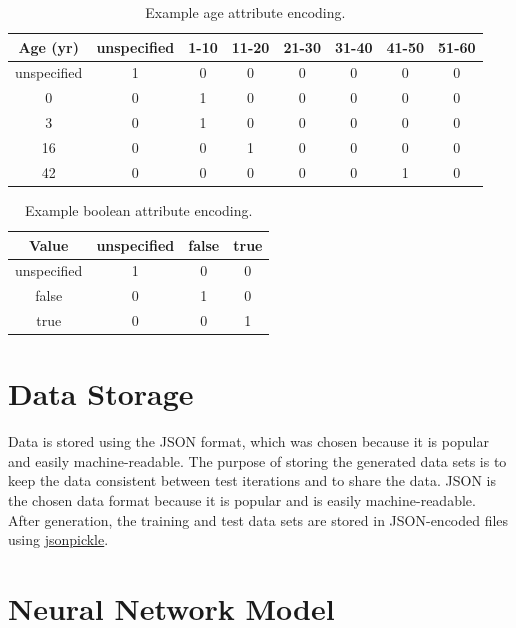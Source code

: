 \documentclass{report}
\begin{document}
\begin{table}
    \centering
    \begin{tabular}{c|c|c|c|c|c|c|c}
        Age (yr) & unspecified & 1-10 & 11-20 & 21-30 & 31-40 & 41-50 & 51-60 \\\hline
        unspecified & 1 & 0 & 0 & 0 & 0 & 0 & 0 \\
        0 & 0 & 1 & 0 & 0 & 0 & 0 & 0 \\
        3 & 0 & 1 & 0 & 0 & 0 & 0 & 0 \\
        16 & 0 & 0 & 1 & 0 & 0 & 0 & 0 \\
        42 & 0 & 0 & 0 & 0 & 0 & 1 & 0
    \end{tabular}
    \caption{Example age attribute encoding.}
    \label{tab:example_age_attribute_encoding}
\end{table}

\begin{table}
    \centering
    \begin{tabular}{c|c|c|c}
        Value & unspecified & false & true \\\hline
        unspecified & 1 & 0 & 0 \\
        false & 0 & 1 & 0 \\
        true & 0 & 0 & 1
    \end{tabular}
    \caption{Example boolean attribute encoding.}
    \label{tab:example_boolean_attribute_encoding}
\end{table}

\section{Data Storage}

Data is stored using the JSON format, which was chosen because it is popular and easily
machine-readable. The purpose of storing the generated data sets is to keep the data consistent
between test iterations and to share the data. JSON is the chosen data format because it is popular
and is easily machine-readable. After generation, the training and test data sets are stored in
JSON-encoded files using \href{https://jsonpickle.github.io/}{jsonpickle}.

\section{Neural Network Model}
\end{document}
